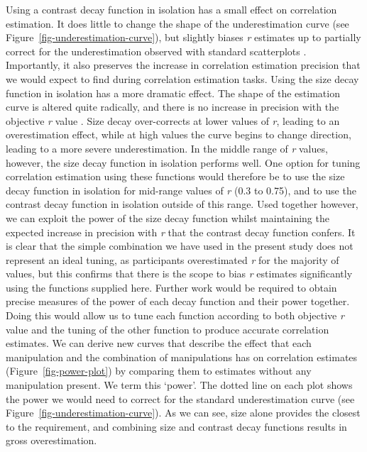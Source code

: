 \documentclass[manuscript, review, anonymous, screen]{acmart}
\begin{document}
Using a contrast decay function in isolation has a small effect on
correlation estimation. It does little to change the shape of the
underestimation curve (see Figure~\ref{fig-underestimation-curve}), but
slightly biases \emph{r} estimates up to partially correct for the
underestimation observed with standard scatterplots \citep{strain_2023}.
Importantly, it also preserves the increase in correlation estimation
precision that we would expect to find during correlation estimation
tasks. Using the size decay function in isolation has a more dramatic
effect. The shape of the estimation curve is altered quite radically,
and there is no increase in precision with the objective \emph{r} value
\citep{strain_2023b}. Size decay over-corrects at lower values of
\emph{r}, leading to an overestimation effect, while at high values the
curve begins to change direction, leading to a more severe
underestimation. In the middle range of \emph{r} values, however, the
size decay function in isolation performs well. One option for tuning
correlation estimation using these functions would therefore be to use
the size decay function in isolation for mid-range values of \emph{r}
(0.3 to 0.75), and to use the contrast decay function in isolation
outside of this range. Used together however, we can exploit the power
of the size decay function whilst maintaining the expected increase in
precision with \emph{r} that the contrast decay function confers. It is
clear that the simple combination we have used in the present study does
not represent an ideal tuning, as participants overestimated \emph{r}
for the majority of values, but this confirms that there is the scope to
bias \emph{r} estimates significantly using the functions supplied here.
Further work would be required to obtain precise measures of the power
of each decay function and their power together. Doing this would allow
us to tune each function according to both objective \emph{r} value and
the tuning of the other function to produce accurate correlation
estimates. We can derive new curves that describe the effect that each
manipulation and the combination of manipulations has on correlation
estimates (Figure~\ref{fig-power-plot}) by comparing them to estimates
without any manipulation present. We term this `power'. The dotted line
on each plot shows the power we would need to correct for the standard
underestimation curve (see Figure~\ref{fig-underestimation-curve}). As
we can see, size alone provides the closest to the requirement, and
combining size and contrast decay functions results in gross
overestimation.
\end{document}
